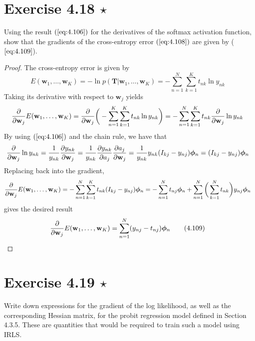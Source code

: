 \section*{Exercise 4.18 $\star$}
Using the result $(\ref{eq:4.106})$ for
the derivatives of the softmax activation function,
show that the gradients of the cross-entropy error $(\ref{eq:4.108})$
are given by ($\ref{eq:4.109}$).

\vspace{1em}

\begin{proof}
    The cross-entropy error is given by
    \begin{equation*}
        E(\mathbf{w}_1, \ldots, \mathbf{w}_K)
        = -\ln p(\mathbf{T} | \mathbf{w}_1, \ldots, \mathbf{w}_K)
        = - \sum_{n=1}^{N} \sum_{k=1}^{K} t_{nk} \ln y_{nk}
        \tag{4.108}\label{eq:4.108}
    \end{equation*}
    Taking its derivative with respect to $\mathbf{w}_j$ yields 
    \begin{align*}
        \pdv{\mathbf{w}_j} E(\mathbf{w}_1, \ldots, \mathbf{w}_K)
        = \pdv{\mathbf{w}_j} \bigg(-\sum_{n=1}^{K} \sum_{k=1}^{K} t_{nk} \ln y_{nk}\bigg) 
        = -\sum_{n=1}^{N} \sum_{k=1}^{K} t_{nk} \pdv{\mathbf{w}_j} \ln y_{nk} 
    \end{align*}
    By using $(\ref{eq:4.106})$ and the chain rule, we have that
    \begin{align*}
        \pdv{\mathbf{w}_j} \ln y_{nk}
        = \frac{1}{y_{nk}} \pdv{y_{nk}}{\mathbf{w}_j}
        = \frac{1}{y_{nk}} \pdv{y_{nk}}{a_j} \pdv{a_j}{\mathbf{w}_j}
        = \frac{1}{y_{nk}} y_{nk}(I_{kj} - y_{nj}) \bm{\phi}_n
        = (I_{kj} - y_{nj})\bm{\phi}_n
    \end{align*}
    Replacing back into the gradient,
    \[
        \pdv{\mathbf{w}_j} E(\mathbf{w}_1, \ldots, \mathbf{w}_K)
        = -\sum_{n=1}^{N} \sum_{k=1}^{K} t_{nk} (I_{kj} - y_{nj}) \bm{\phi}_n
        = -\sum_{n=1}^{N} t_{nj}\bm{\phi}_n 
        + \sum_{n=1}^{N} \bigg(\sum_{k=1}^{N} t_{nk}\bigg) y_{nj} \bm{\phi}_n
    \] 
    gives the desired result
    \begin{equation*}
        \pdv{\mathbf{w}_j}E(\mathbf{w}_1, \ldots, \mathbf{w}_K)
        = \sum_{n=1}^{N} (y_{nj} - t_{nj})\bm{\phi}_n
        \tag{4.109}\label{eq:4.109}
    \end{equation*}
\end{proof}

\section*{Exercise 4.19 $\star$}
Write down expressions for the gradient of the log likelihood,
as well as the corresponding Hessian matrix, for the probit regression
model defined in Section 4.3.5. These are quantities that would be required to train such 
a model using IRLS.

